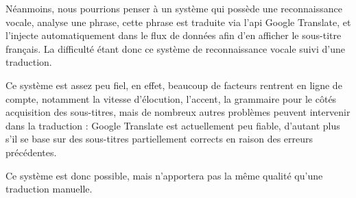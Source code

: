 \documentclass[a4paper, 11pt]{article}
\begin{document}
	Néanmoins, nous pourrions penser à un système qui possède
	une reconnaissance vocale, analyse une phrase, cette
	phrase est traduite via l'api Google Translate, et l'injecte automatiquement dans le flux de données
	afin d'en afficher le sous-titre français. La difficulté
	étant donc ce système de reconnaissance vocale suivi
	d'une traduction.

	Ce système est assez peu fiel, en effet, beaucoup de facteurs rentrent en ligne de
	compte, notamment la vitesse d'élocution, l'accent, la
	grammaire pour le côtés acquisition des sous-titres, mais
	de nombreux autres problèmes peuvent intervenir dans la
	traduction : Google Translate est actuellement peu
	fiable, d'autant plus s'il se base sur des sous-titres
	partiellement corrects en raison des erreurs précédentes.

	Ce système est donc possible, mais n'apportera pas la
	même qualité qu'une traduction manuelle.
	\appendix
	\lstlistoflistings
	\listoffigures
	
\end{document}
